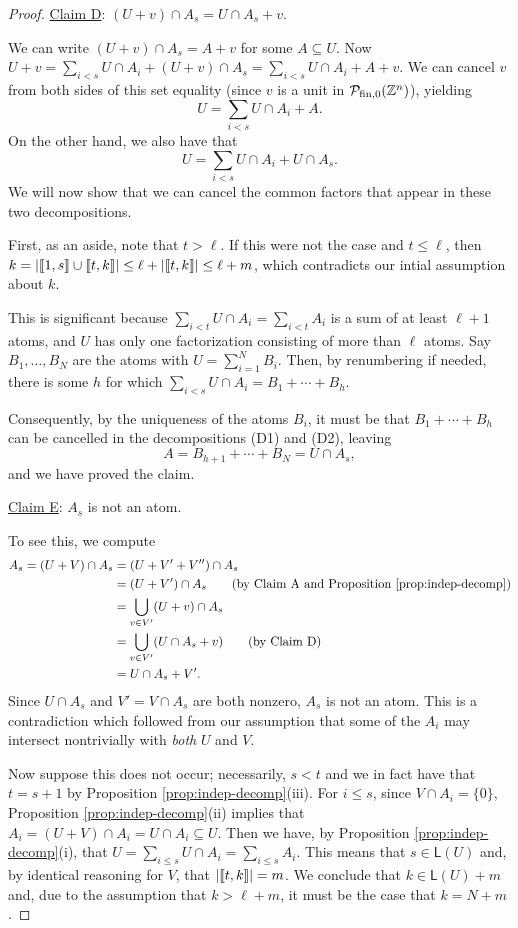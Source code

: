 \begin{proof}
\noindent\underline{Claim D}: $(U+v)\cap A_s = U\cap A_s + v$. \label{cld}

We can write $(U+v)\cap A_s = A + v$ for some $A \subseteq U$.
Now $U+v = \sum_{i<s} U\cap A_i + (U+v)\cap A_s = \sum_{i<s} U\cap A_i + A + v$.
We can cancel $v$ from both sides of this set equality (since $v$ is a unit in $\mathcal{P}_{\textrm{fin}, 0}(\mathbb{Z}^n)$), yielding
\[ U = \sum_{i<s} U\cap A_i + A. \tag{D1}\]
On the other hand, we also have that
\[ U = \sum_{i<s} U\cap A_i + U\cap A_s. \tag{D2}\]
We will now show that we can cancel the common factors that appear in these two decompositions.

First, as an aside, note that $t > \ell$.
If this were not the case and $t \le \ell$, then $k = | \llbracket 1,s \rrbracket \cup \llbracket t,k \rrbracket | \le \ell + | \llbracket t,k \rrbracket | \le \ell+m$, which contradicts our intial assumption about $k$.

This is significant because $\sum_{i<t} U\cap A_i = \sum_{i<t} A_i$ is a sum of at least $\ell+1$ atoms, and $U$ has only one factorization consisting of more than $\ell$ atoms.
Say $B_1,\dots, B_{N}$ are the atoms with $U = \sum_{i=1}^{N} B_i$.
Then, by renumbering if needed, there is some $h$ for which $\sum_{i<s} U\cap A_i = B_1 + \cdots + B_h$.

Consequently, by the uniqueness of the atoms $B_i$, it must be that $B_1 +\cdots + B_h$ can be cancelled in the decompositions (D1) and (D2), leaving
\[ A = B_{h+1} +\cdots+ B_{N} = U\cap A_s, \]
and we have proved the claim.

\noindent\underline{Claim E}: $A_s$ is not an atom. \label{cle}

To see this, we compute
\begin{align*}
A_s = (U+V)\cap A_s 
&= (U+V'+V'') \cap A_s \\
&= (U+V') \cap A_s \tag{by Claim A and Proposition \ref{prop:indep-decomp}} \\
&= \bigcup_{v\in V'} (U+v)\cap A_s \\
&= \bigcup_{v\in V'} (U\cap A_s + v) \tag{by Claim D} \\
&= U\cap A_s + V'.
\end{align*}
Since $U\cap A_s$ and $V' = V\cap A_s$ are both nonzero, $A_s$ is not an atom.
This is a contradiction which followed from our assumption that some of the $A_i$ may intersect nontrivially with \textit{both} $U$ and $V$.

Now suppose this does not occur; necessarily, $s < t$ and we in fact have that $t = s+1$ by Proposition \ref{prop:indep-decomp}(iii).
For $i \le s$, since $V\cap A_i  = \{0\}$, Proposition \ref{prop:indep-decomp}(ii) implies that $A_i = (U+V)\cap A_i = U\cap A_i \subseteq U$.
Then we have, by Proposition \ref{prop:indep-decomp}(i), that $U = \sum_{i\le s} U\cap A_i = \sum_{i\le s} A_i$.
This means that $s\in \mathsf{L}(U)$ and, by identical reasoning for $V$, that $| \llbracket t,k \rrbracket| = m$.
We conclude that $k \in \mathsf{L}(U) + m$ and, due to the assumption that $k>\ell+m$, it must be the case that $k = N + m$.
\end{proof}


